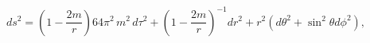 \begin{equation}
ds^2=\left(1-\frac{2m}{r}\right)
64\pi^{2}\,m^{2}\,d\tau^{2}+\left(1-\frac{2m}{r}\right)^{-1}dr^{2}+r^{2}(d\theta^{2}+\sin^{2}\theta
d\phi^{2}) \label{Sch1},
\end{equation}

